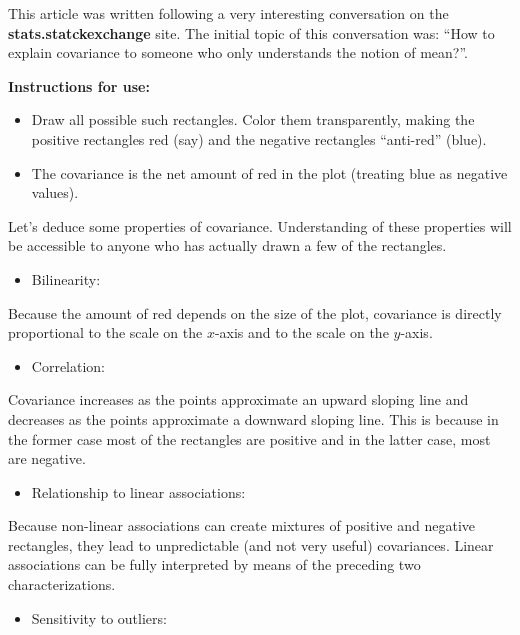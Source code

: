 \documentclass[
]{report}
\providecommand{\tightlist}{%
  \setlength{\itemsep}{0pt}\setlength{\parskip}{0pt}}
\begin{document}
This article \citep{chudzicki} was written following a very interesting conversation on the \textbf{stats.statckexchange} site. The initial topic of this conversation was: ``How to explain covariance to someone who only understands the notion of mean?''.

\textbf{Instructions for use:}

\begin{itemize}
\tightlist
\item
  Draw all possible such rectangles. Color them transparently, making the positive rectangles red (say) and the negative rectangles ``anti-red'' (blue).
\item
  The covariance is the net amount of red in the plot (treating blue as negative values).
\end{itemize}

Let's deduce some properties of covariance. Understanding of these properties will be accessible to anyone who has actually drawn a few of the rectangles.

\begin{itemize}
\tightlist
\item
  Bilinearity:
\end{itemize}

Because the amount of red depends on the size of the plot, covariance is directly proportional to the scale on the \(x\)-axis and to the scale on the \(y\)-axis.

\begin{itemize}
\tightlist
\item
  Correlation:
\end{itemize}

Covariance increases as the points approximate an upward sloping line and decreases as the points approximate a downward sloping line. This is because in the former case most of the rectangles are positive and in the latter case, most are negative.

\begin{itemize}
\tightlist
\item
  Relationship to linear associations:
\end{itemize}

Because non-linear associations can create mixtures of positive and negative rectangles, they lead to unpredictable (and not very useful) covariances. Linear associations can be fully interpreted by means of the preceding two characterizations.

\begin{itemize}
\tightlist
\item
  Sensitivity to outliers:
\end{itemize}
\end{document}
